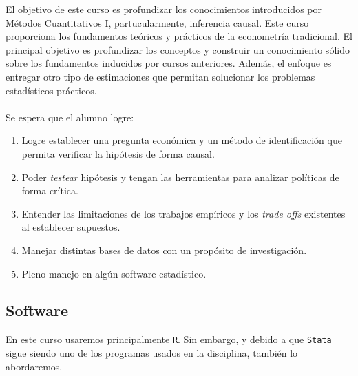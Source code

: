 \documentclass[letterpaper]{article}
\begin{document}
El objetivo de este curso es profundizar los conocimientos introducidos por M\'etodos Cuantitativos I, partucularmente, inferencia causal. Este curso proporciona los fundamentos te\'oricos y pr\'acticos de la econometr\'ia tradicional. El principal objetivo es profundizar los conceptos y construir un conocimiento s\'olido sobre los fundamentos inducidos por cursos anteriores. Adem\'as, el enfoque es entregar otro tipo de estimaciones que permitan solucionar los problemas estad\'isticos pr\'acticos.
\\
\\
Se espera que el alumno logre:
\begin{enumerate}
\item Logre establecer una pregunta econ\'omica y un m\'etodo de identificaci\'on que permita verificar la hip\'otesis de forma causal.
\item Poder \emph{testear} hip\'otesis y tengan las herramientas para analizar pol\'iticas de forma cr\'itica.
\item Entender las limitaciones de los trabajos emp\'iricos y los \emph{trade offs} existentes al establecer supuestos.
\item Manejar distintas bases de datos con un prop\'osito de investigaci\'on.
\item Pleno manejo en alg\'un software estad\'istico.
\end{enumerate}





\subsection*{Software}

En este curso usaremos principalmente \texttt{R}. Sin embargo, y debido a que \texttt{Stata} sigue siendo uno de los programas usados en la disciplina, tambi\'en lo abordaremos.
\end{document}
